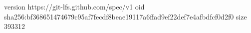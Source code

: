 version https://git-lfs.github.com/spec/v1
oid sha256:bf368651474679c95af7fecdf8beae19117a6ffad9ef22def7e4afbdfcf0d2f0
size 393312
